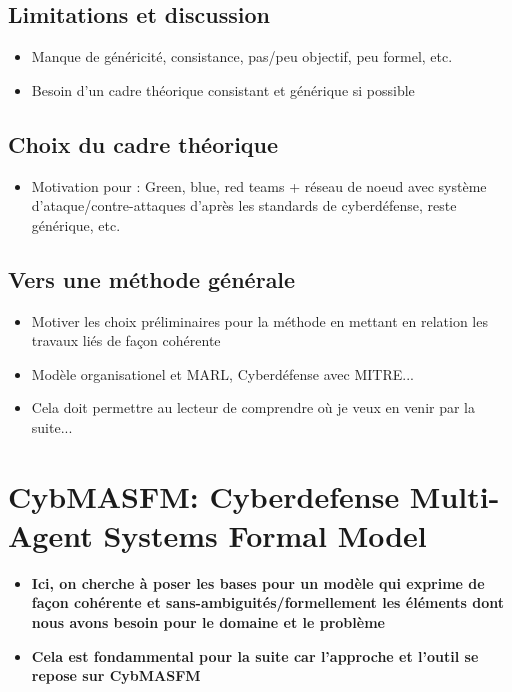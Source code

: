 \documentclass{article}
\begin{document}
\subsection{Limitations et discussion}
\begin{itemize}

    \item Manque de généricité, consistance, pas/peu objectif, peu formel, etc.
    \item Besoin d’un cadre théorique consistant et générique si possible
\end{itemize}
\subsection{Choix du cadre théorique}
\begin{itemize}
    \item Motivation pour : Green, blue, red teams + réseau de noeud avec système d’ataque/contre-attaques d’après les standards de cyberdéfense, reste générique, etc.
\end{itemize}
\subsection{Vers une méthode générale}
\begin{itemize}

    \item Motiver les choix préliminaires pour la méthode en mettant en relation les travaux liés de façon cohérente
    \item Modèle organisationel et MARL, Cyberdéfense avec MITRE...
    \item Cela doit permettre au lecteur de comprendre où je veux en venir par la suite...
\end{itemize}


\section{CybMASFM: Cyberdefense Multi-Agent Systems Formal Model}
\begin{itemize}

    \item \textbf{Ici, on cherche à poser les bases pour un modèle qui exprime de façon cohérente et sans-ambiguités/formellement les éléments dont nous avons besoin pour le domaine et le problème}
    \item \textbf{Cela est fondammental pour la suite car l'approche et l'outil se repose sur CybMASFM}
\end{itemize}
\end{document}
